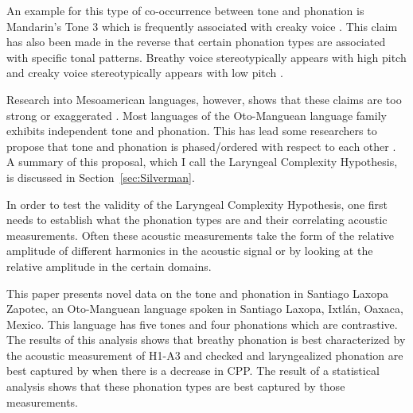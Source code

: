 \documentclass[12pt, letterpaper]{article}
\begin{document}
An example for this type of co-occurrence between tone and phonation is Mandarin's Tone 3 which is frequently associated with creaky voice \citep{hockettPeipingPhonology1947,}. This claim has also been made in the reverse that certain phonation types are associated with specific tonal patterns. Breathy voice stereotypically appears with high pitch and creaky voice stereotypically appears with low pitch \citep{eslingVoiceQualityLaryngeal2019}.

Research into Mesoamerican languages, however, shows that these claims are too strong or exaggerated \citep{suarezMesoamericanIndianLanguages1983,campbellMesoAmericaLinguisticArea1986,silvermanLaryngealComplexityOtomanguean1997,dicanioPhoneticsPhonologySan2008,espositoVariationContrastivePhonation2010, campbellOtomangueanHistoricalLinguistics2017a,campbellOtomangueanHistoricalLinguistics2017}. 
Most languages of the Oto-Manguean language family exhibits independent tone and phonation. This has lead some researchers to propose that tone and phonation is phased/ordered with respect to each other \citep{silvermanLaryngealComplexityOtomanguean1997,blankenshipTimeCourseBreathiness1997,blankenshipTimingNonmodalPhonation2002}. A summary of this proposal, which I call the Laryngeal Complexity Hypothesis, is discussed in Section~\ref{sec:Silverman}. 

In order to test the validity of the Laryngeal Complexity Hypothesis, one first needs to establish what the phonation types are and their correlating acoustic measurements. Often these acoustic measurements take the form of the relative amplitude of different harmonics in the acoustic signal or by looking at the relative amplitude in the certain domains. 

This paper presents novel data on the tone and phonation in Santiago Laxopa Zapotec, an Oto-Manguean language spoken in Santiago Laxopa, Ixtlán, Oaxaca, Mexico. This language has five tones and four phonations which are contrastive. The results of this analysis shows that breathy phonation is best characterized by the acoustic measurement of H1-A3 and checked and laryngealized phonation are best captured by when there is a decrease in CPP. The result of a statistical analysis shows that these phonation types are best captured by those measurements.

\end{document}
